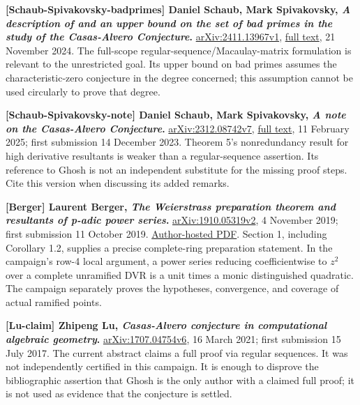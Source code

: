 \documentclass[
  british,
  10pt,
]{article}
\begin{document}
\textbf{{[}Schaub-Spivakovsky-badprimes{]} Daniel Schaub, Mark
Spivakovsky, \emph{A description of and an upper bound on the set of bad
primes in the study of the Casas-Alvero Conjecture}.}
\href{https://arxiv.org/abs/2411.13967v1}{arXiv:2411.13967v1},
\href{https://arxiv.org/html/2411.13967v1}{full text}, 21 November 2024.
The full-scope regular-sequence/Macaulay-matrix formulation is relevant
to the unrestricted goal. Its upper bound on bad primes assumes the
characteristic-zero conjecture in the degree concerned; this assumption
cannot be used circularly to prove that degree.

\textbf{{[}Schaub-Spivakovsky-note{]} Daniel Schaub, Mark Spivakovsky,
\emph{A note on the Casas-Alvero Conjecture}.}
\href{https://arxiv.org/abs/2312.08742v7}{arXiv:2312.08742v7},
\href{https://arxiv.org/html/2312.08742v7}{full text}, 11 February 2025;
first submission 14 December 2023. Theorem 5's nonredundancy result for
high derivative resultants is weaker than a regular-sequence assertion.
Its reference to Ghosh is not an independent substitute for the missing
proof steps. Cite this version when discussing its added remarks.

\textbf{{[}Berger{]} Laurent Berger, \emph{The Weierstrass preparation
theorem and resultants of p-adic power series}.}
\href{https://arxiv.org/abs/1910.05319v2}{arXiv:1910.05319v2}, 4
November 2019; first submission 11 October 2019.
\href{https://perso.ens-lyon.fr/laurent.berger/articles/article33.pdf}{Author-hosted
PDF}. Section 1, including Corollary 1.2, supplies a precise
complete-ring preparation statement. In the campaign's row-4 local
argument, a power series reducing coefficientwise to \(z^2\) over a
complete unramified DVR is a unit times a monic distinguished quadratic.
The campaign separately proves the hypotheses, convergence, and coverage
of actual ramified points.

\textbf{{[}Lu-claim{]} Zhipeng Lu, \emph{Casas-Alvero conjecture in
computational algebraic geometry}.}
\href{https://arxiv.org/abs/1707.04754v6}{arXiv:1707.04754v6}, 16 March
2021; first submission 15 July 2017. The current abstract claims a full
proof via regular sequences. It was not independently certified in this
campaign. It is enough to disprove the bibliographic assertion that
Ghosh is the only author with a claimed full proof; it is not used as
evidence that the conjecture is settled.
\end{document}
